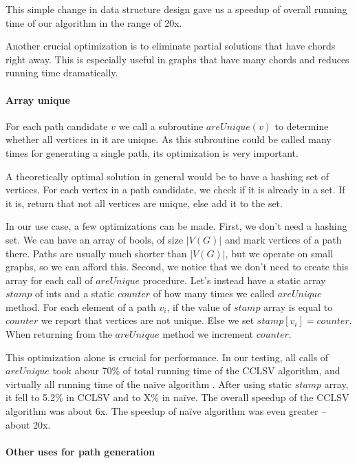 This simple change in data structure design gave us a speedup of overall running time of our algorithm in the range of 20x.

Another crucial optimization is to eliminate partial solutions that have chords right away. This is especially useful in graphs that have many chords and reduces running time dramatically.

\paragraph{Array unique}

For each path candidate $v$ we call a subroutine $areUnique(v)$ to determine whether all vertices in it are unique. As this subroutine could be called many times for generating a single path, its optimization is very important.

A theoretically optimal solution in general would be to have a hashing set of vertices. For each vertex in a path candidate, we check if it is already in a set. If it is, return that not all vertices are unique, else add it to the set.

In our use case, a few optimizations can be made. First, we don't need a hashing set. We can have an array of bools, of size $|V(G)|$ and mark vertices of a path there. Paths are usually much shorter than $|V(G)|$, but we operate on small graphs, so we can afford this. Second, we notice that we don't need to create this array for each call of $areUnique$ procedure. Let's instead have a static array $stamp$ of ints and a static $counter$ of how many times we called $areUnique$ method. For each element of a path $v_i$, if the value of $stamp$ array is equal to $counter$ we report that vertices are not unique. Else we set $stamp[v_i] = counter$. When returning from the $areUnique$ method we increment $counter$.

This optimization alone is crucial for performance. In our testing, all calls of $areUnique$ took abour 70\% of total running time of the CCLSV algorithm, and virtually all running time of the na\"ive algorithm . After using static $stamp$ array, it fell to 5.2\% in CCLSV and to X\% in na\"ive. The overall speedup of the CCLSV algorithm was about 6x.  The speedup of na\"ive algorithm was even greater -- about 20x.

\paragraph{Other uses for path generation}
\label{sec:usesGeneration}


